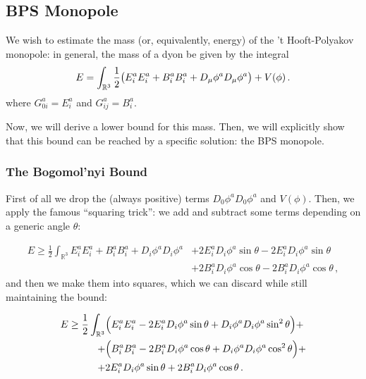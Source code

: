 \documentclass[main.tex]{subfiles}
\begin{document}
\subsection{BPS Monopole}

We wish to estimate the mass (or, equivalently, energy) of the 't Hooft-Polyakov monopole: in general, the mass of a dyon be given by the integral
%
\begin{equation} \label{eq:monopole-mass}
  E = \int_{\mathbb{R}^3}
  \frac{1}{2} \qty(E_i^a E_i^a + B_i^a B_i^a + D_\mu \phi^a D_\mu \phi^a) + V(\phi)\,.
\end{equation}
%
where \(G_{0i}^a = E_i^a\) and \(G_{ij}^a = B_i^a\).

Now, we will derive a lower bound for this mass. Then, we will explicitly show that this bound can be reached by a specific solution: the BPS monopole.

\subsubsection{The Bogomol'nyi Bound}

First of all we drop the (always positive) terms \(D_0 \phi^a D_0 \phi^a\) and \(V(\phi)\).
Then, we apply the famous ``squaring trick'': we add and subtract some terms depending on a generic angle \(\theta\):

\begin{equation}
\begin{split}
    E \geq \frac{1}{2}  \int_{\mathbb R^3}   E_i^a E_i^a + B_i^a B_i^a + D_i \phi^a D_i \phi^a &+2 E_i^a D_i \phi^a \sin \theta - 2E_i^a D_i \phi^a \sin \theta \\
  &+2 B_i^a D_i \phi^a \cos \theta - 2 B_i^a D_i \phi^a \cos \theta \,,
\end{split}
\end{equation}
%
and then we make them into squares, which we can discard while still maintaining the bound:
%

\begin{equation}
\begin{split}
    E \geq  \frac{1}{2} \int_{\mathbb R^3}
    &\qty(E_i^a E_i^a - 2 E_i^a D_i\phi^a \sin\theta + D_i\phi^a D_i\phi^a \sin^2\theta) + \\
    + &\qty( B_i^a B_i^a - 2 B_i^a D_i\phi^a \cos\theta + D_i\phi^a D_i\phi^a \cos^2\theta) +  \\
    +&2 E_i^a D_i \phi^a \sin \theta+2 B_i^a D_i \phi^a \cos \theta \,.
\end{split}
\end{equation}
\end{document}
